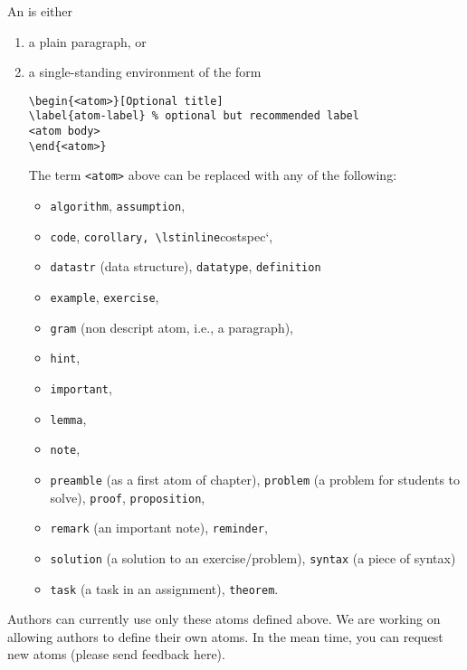 \begin{definition}[Atom]
An  is either
\begin{enumerate}
\item a plain paragraph, or
\item a single-standing environment of the form

\begin{lstlisting}
\begin{<atom>}[Optional title]
\label{atom-label} % optional but recommended label
<atom body>
\end{<atom>}
\end{lstlisting}
%
The term \lstinline`<atom>` above can be replaced with any of the following:
\begin{itemize}
\item \lstinline`algorithm`, \lstinline`assumption`,
\item \lstinline`code`, \lstinline`corollary, \lstinline`costspec`,
\item \lstinline`datastr` (data structure), \lstinline`datatype`, \lstinline`definition`
\item \lstinline`example`, \lstinline`exercise`,
\item \lstinline`gram`  (non descript atom, i.e., a paragraph),
\item \lstinline`hint`, 
\item \lstinline`important`, 
\item \lstinline`lemma`,
\item \lstinline`note`,
\item \lstinline`preamble` (as a  first atom of chapter), \lstinline`problem` (a problem for students to solve), \lstinline`proof`, \lstinline`proposition`,
\item \lstinline`remark` (an important note), \lstinline`reminder`,
\item \lstinline`solution` (a solution to an exercise/problem), \lstinline`syntax` (a piece of syntax)
\item \lstinline`task` (a task in an assignment), \lstinline`theorem`.
\end{itemize}
\end{enumerate}

\end{definition}

\begin{note}
Authors can currently use only these atoms defined above. We are working on allowing authors to define their own atoms.  
%
In the mean time, you can request new atoms  (please send feedback here).
\end{note}

